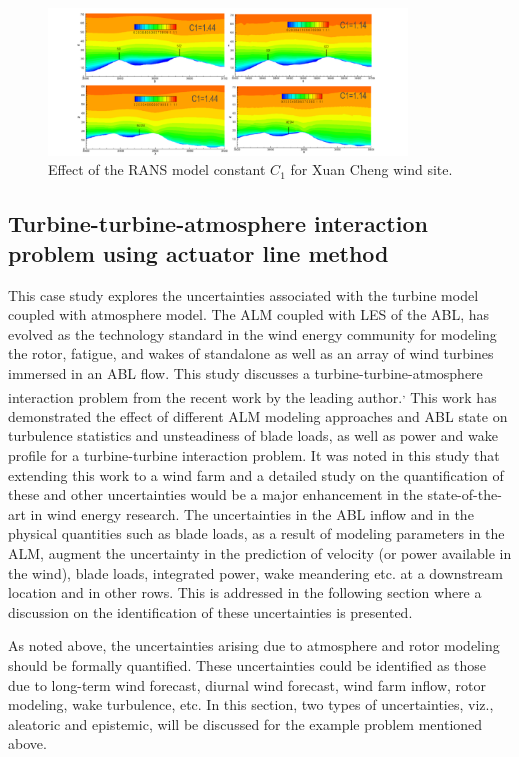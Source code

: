 \documentclass[]{aiaa-tc}%
\begin{document}
\begin{figure}
\centering
 \includegraphics[width=0.85\textwidth]{XuanCheng_C1_Effect.png}
 \caption{Effect of the RANS model constant $C_1$ for Xuan Cheng wind site.}
 \label{f:XuanCheng_C1}
\end{figure}


\subsection{Turbine-turbine-atmosphere interaction problem using actuator line method} \label{abl_alm}

This case study explores the uncertainties associated with the turbine model coupled with atmosphere model. 
The ALM coupled with LES of the ABL, has evolved as the technology standard in the wind energy community for modeling the rotor, fatigue, and wakes of standalone as well as an array of wind turbines immersed in an ABL flow. This study discusses a turbine-turbine-atmosphere interaction problem from the recent work by the leading author.\cite{jha:aiaa2014}\textsuperscript{, }\cite{jha:jsee2014} This work has demonstrated the effect of different ALM modeling approaches and ABL state on turbulence statistics and unsteadiness of blade loads, as well as power and wake profile for a turbine-turbine interaction problem. It was noted in this study that extending this work to a wind farm and a detailed study on the quantification of these and other uncertainties would be a major enhancement in the state-of-the-art in wind energy research. The uncertainties in the ABL inflow and in the physical quantities such as blade loads, as a result of modeling parameters in the ALM, augment the uncertainty in the prediction of velocity (or power available in the wind), blade loads, integrated power, wake meandering etc. at a downstream location and in other rows. This is addressed in the following section where a discussion on the identification of these uncertainties is presented.

As noted above, the uncertainties arising due to atmosphere and rotor modeling should be formally quantified. These uncertainties could be identified as those due to long-term wind forecast, diurnal wind forecast, wind farm inflow, rotor modeling, wake turbulence, etc. In this section, two types of uncertainties, viz., aleatoric and epistemic, will be discussed for the example problem mentioned above. 
\end{document}
